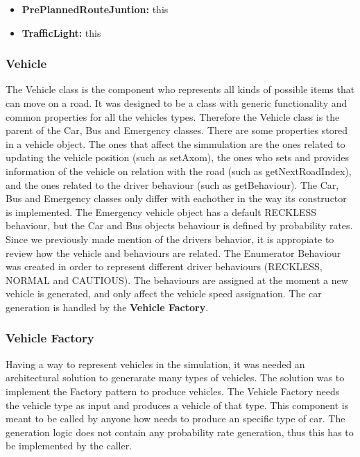 \documentclass[11pt]{article}
\begin{document}
{\begin{itemize}
    \begin{itemize}[noitemsep]
    \item \textbf{PrePlannedRouteJuntion:} this  
    \item \textbf{TrafficLight:} this
    \end{itemize}
    
\subsubsection{Vehicle}
The Vehicle class is the component who represents all kinds of possible items that can move on a road. It was designed to be a class with generic functionality and common properties for all the vehicles types. Therefore the Vehicle class is the parent of the Car, Bus and Emergency classes.
There are some properties stored in a vehicle object. The ones that affect the simmulation are the ones related to updating the vehicle position (such as setAxom), the ones who sets and provides information of the vehicle on relation with the road (such as getNextRoadIndex), and the ones related to the driver behaviour (such as getBehaviour).
The Car, Bus and Emergency classes only differ with eachother in the way its constructor is implemented. The Emergency vehicle object has a default RECKLESS behaviour, but the Car and Bus objects behaviour is defined by probability rates.
Since we previously made mention of the drivers behavior, it is appropiate to review how the vehicle and behaviours are related.  The Enumerator Behaviour was created in order to represent different driver behaviours (RECKLESS, NORMAL and CAUTIOUS). The behaviours are assigned at the moment a new vehicle is generated, and only affect the vehicle speed assignation.
The car generation is handled by the \textbf{Vehicle Factory}.

\subsubsection{Vehicle Factory}
Having a way to represent vehicles in the simulation, it was needed an architectural solution to generarate many types of vehicles. The solution was to implement the Factory pattern to produce vehicles. The Vehicle Factory needs the vehicle type as input and produces a vehicle of that type.
This component is meant to be called by anyone how needs to produce an specific type of car. The generation logic does not contain any probability rate generation, thus this has to be implemented by the caller.


\end{itemize}}
\end{document}
